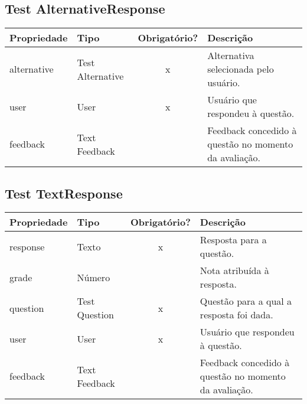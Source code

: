 \subsection{Test AlternativeResponse} \label{Test AlternativeResponse}
\begin{table}[H]
	\footnotesize
	\begin{tabularx}{\textwidth}{|X|X|c|p{7.8cm}|}   \hline \rowcolor[rgb]{0.8,0.8,0.8}
		
		\textbf{Propriedade} & \textbf{Tipo} & \textbf{Obrigatório?} & \centerline{\textbf{Descrição}} \\\hline  	
		
		alternative & Test Alternative & x & Alternativa selecionada pelo usuário. \\\hline
		user & User & x & Usuário que respondeu à questão. \\\hline
		feedback & Text Feedback & {} & Feedback concedido à questão no momento da avaliação. \\\hline
		
	\end{tabularx}	
\end{table}

\subsection{Test TextResponse} \label{Test TextResponse}
\begin{table}[H]
	\footnotesize
	\begin{tabularx}{\textwidth}{|X|X|c|p{7.8cm}|}   \hline \rowcolor[rgb]{0.8,0.8,0.8}
		
		\textbf{Propriedade} & \textbf{Tipo} & \textbf{Obrigatório?} & \centerline{\textbf{Descrição}} \\\hline  	
		
		response & Texto & x & Resposta para a questão. \\\hline		
		grade & Número & {} & Nota atribuída à resposta. \\\hline	
		question & Test Question & x & Questão para a qual a resposta foi dada.\\\hline
		user & User & x & Usuário que respondeu à questão. \\\hline
		feedback & Text Feedback & {} & Feedback concedido à questão no momento da avaliação. \\\hline			
		
	\end{tabularx}	
\end{table}


